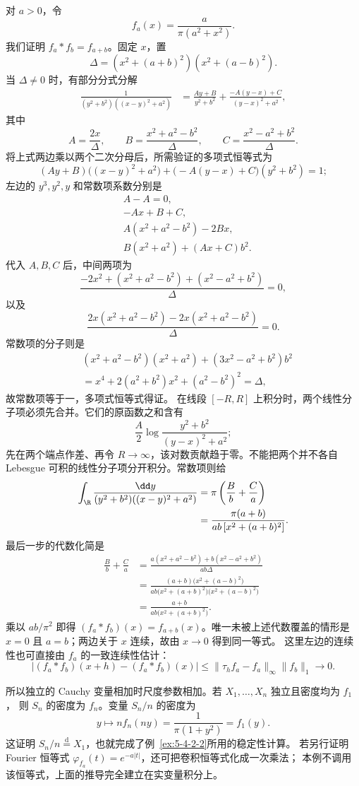 \begin{example}\label{ex:5-4-3-cauchy-stability}
对 $a>0$，令
\[
 f_a(x)=\frac{a}{\pi(a^2+x^2)}.
\]
我们证明 $f_a*f_b=f_{a+b}$。固定 $x$，置
\[
 \Delta=(x^2+(a+b)^2)(x^2+(a-b)^2).
\]
当 $\Delta\ne0$ 时，有部分分式分解
\begin{align*}
 \frac1{(y^2+b^2)((x-y)^2+a^2)}
 &=\frac{Ay+B}{y^2+b^2}
   +\frac{-A(y-x)+C}{(y-x)^2+a^2},
\end{align*}
其中
\[
 A=\frac{2x}{\Delta},\qquad
 B=\frac{x^2+a^2-b^2}{\Delta},\qquad
 C=\frac{x^2-a^2+b^2}{\Delta}.
\]
将上式两边乘以两个二次分母后，所需验证的多项式恒等式为
\[
 (Ay+B)\bigl((x-y)^2+a^2\bigr)
 +\bigl(-A(y-x)+C\bigr)(y^2+b^2)=1;
\]
左边的 $y^3,y^2,y$ 和常数项系数分别是
\begin{align*}
 &A-A=0,\\
 &-Ax+B+C,\\
 &A(x^2+a^2-b^2)-2Bx,\\
 &B(x^2+a^2)+(Ax+C)b^2.
\end{align*}
代入 $A,B,C$ 后，中间两项为
\[
 \frac{-2x^2+(x^2+a^2-b^2)+(x^2-a^2+b^2)}{\Delta}=0,
\]
以及
\[
 \frac{2x(x^2+a^2-b^2)-2x(x^2+a^2-b^2)}{\Delta}=0.
\]
常数项的分子则是
\begin{align*}
 &(x^2+a^2-b^2)(x^2+a^2)+(3x^2-a^2+b^2)b^2\\
 &=x^4+2(a^2+b^2)x^2+(a^2-b^2)^2
 =\Delta,
\end{align*}
故常数项等于一，多项式恒等式得证。
在线段 $[-R,R]$ 上积分时，两个线性分子项必须先合并。它们的原函数之和含有
\[
 \frac A2\log\frac{y^2+b^2}{(y-x)^2+a^2};
\]
先在两个端点作差、再令 $R\to\infty$，该对数贡献趋于零。不能把两个并不各自
Lebesgue 可积的线性分子项分开积分。常数项则给
\begin{align*}
 \int_{\R}\frac{\dd y}{(y^2+b^2)((x-y)^2+a^2)}
 &=\pi\left(\frac B b+\frac C a\right)\\
 &=\frac{\pi(a+b)}{ab\,[x^2+(a+b)^2]}.
\end{align*}
最后一步的代数化简是
\begin{align*}
 \frac Bb+\frac Ca
 &=\frac{a(x^2+a^2-b^2)+b(x^2-a^2+b^2)}{ab\Delta}\\
 &=\frac{(a+b)\bigl(x^2+(a-b)^2\bigr)}
 {ab\bigl(x^2+(a+b)^2\bigr)\bigl(x^2+(a-b)^2\bigr)}\\
 &=\frac{a+b}{ab\bigl(x^2+(a+b)^2\bigr)}.
\end{align*}
乘以 $ab/\pi^2$ 即得 $(f_a*f_b)(x)=f_{a+b}(x)$。唯一未被上述代数覆盖的情形是
$x=0$ 且 $a=b$；两边关于 $x$ 连续，故由 $x\to0$ 得到同一等式。
这里左边的连续性也可直接由 $f_a$ 的一致连续性估计：
\[
 |(f_a*f_b)(x+h)-(f_a*f_b)(x)|
 \leq\|\tau_hf_a-f_a\|_\infty\|f_b\|_1\longrightarrow0.
\]

所以独立的 Cauchy 变量相加时尺度参数相加。若 $X_1,\dots,X_n$ 独立且密度均为 $f_1$，
则 $S_n$ 的密度为 $f_n$。变量 $S_n/n$ 的密度为
\[
 y\longmapsto n f_n(ny)
 =\frac1{\pi(1+y^2)}=f_1(y).
\]
这证明 $S_n/n\overset{\mathrm d}=X_1$，也就完成了例~\ref{ex:5-4-2-2}所用的稳定性计算。
若另行证明 Fourier 恒等式 $\varphi_{f_a}(t)=e^{-a|t|}$，还可把卷积恒等式化成一次乘法；
本例不调用该恒等式，上面的推导完全建立在实变量积分上。
\end{example}

